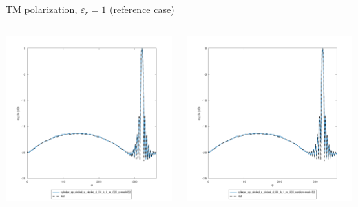 \begin{frame}{TM polarization, $\varepsilon_r=1$ (reference case)}
\begin{columns}

\includegraphics[width=\linewidth]{results/FF/cylD_01_H_1_M_025_Z/iiee_norm.png}


\includegraphics[width=\linewidth]{results/FF/cylD_01_H_1_M_025_RANDOM/iiee_norm.png}

\end{columns}


\end{frame}


